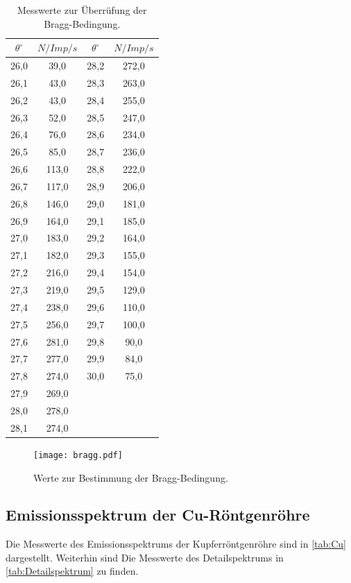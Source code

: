 \begin{table}
  \centering
  \begin{tabular}{c c | c c}
    \toprule
    $\theta^{\circ}$ & $N/Imp/s$ & $\theta^{\circ}$ & $N/Imp/s$ \\
    \midrule
    26,0 &  39,0 & 28,2 & 272,0 \\
    26,1 &  43,0 & 28,3 & 263,0 \\
    26,2 &  43,0 & 28,4 & 255,0 \\
    26,3 &  52,0 & 28,5 & 247,0 \\
    26,4 &  76,0 & 28,6 & 234,0 \\
    26,5 &  85,0 & 28,7 & 236,0 \\
    26,6 & 113,0 & 28,8 & 222,0 \\
    26,7 & 117,0 & 28,9 & 206,0 \\
    26,8 & 146,0 & 29,0 & 181,0 \\
    26,9 & 164,0 & 29,1 & 185,0 \\
    27,0 & 183,0 & 29,2 & 164,0 \\
    27,1 & 182,0 & 29,3 & 155,0 \\
    27,2 & 216,0 & 29,4 & 154,0 \\
    27,3 & 219,0 & 29,5 & 129,0 \\
    27,4 & 238,0 & 29,6 & 110,0 \\
    27,5 & 256,0 & 29,7 & 100,0 \\
    27,6 & 281,0 & 29,8 &  90,0 \\
    27,7 & 277,0 & 29,9 &  84,0 \\
    27,8 & 274,0 & 30,0 &  75,0 \\
    27,9 & 269,0 & & \\
    28,0 & 278,0 & & \\
    28,1 & 274,0 & & \\
    \bottomrule
  \end{tabular}
  \caption{Messwerte zur Überrüfung der Bragg-Bedingung.}
  \label{tab:Bragg}
\end{table}

\begin{figure}
  \centering
  \texttt{[image: bragg.pdf]}
  \caption{Werte zur Bestimmung der Bragg-Bedingung.}
  \label{fig:bragg}
\end{figure}

\subsection{Emissionsspektrum der Cu-Röntgenröhre}
\label{sec:cu}
Die Messwerte des Emissionsspektrums der Kupferröntgenröhre sind in \autoref{tab:Cu} dargestellt. Weiterhin sind Die
Messwerte des Detailspektrums in \autoref{tab:Detailspektrum} zu finden.

